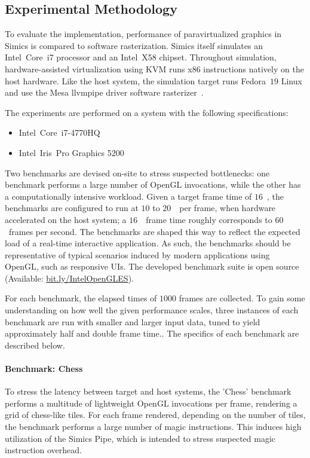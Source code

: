 \subsection{Experimental Methodology}
\label{sec:experimentalmethodology}
To evaluate the implementation, performance of paravirtualized graphics in Simics is compared to software rasterization.
Simics itself simulates an Intel\circledR ~Core\texttrademark ~i7 processor and an Intel\circledR ~X58 chipset.
Throughout simulation, hardware-assisted virtualization using KVM runs x86 instructions natively on the host hardware.
Like the host system, the simulation target runs Fedora~$19$ Linux and use the Mesa llvmpipe driver software rasterizer~.

The experiments are performed on a system with the following specifications:
\begin{itemize}
\item Intel\circledR\ Core\texttrademark\ i7-4770HQ
\item Intel\circledR\ Iris\texttrademark\ Pro Graphics 5200
\end{itemize}

Two benchmarks are devised on-site to stress suspected bottlenecks: one benchmark performs a large number of OpenGL invocations, while the other has a computationally intensive workload.
Given a target frame time of $16$~\milli\second , the benchmarks are configured to run at $10$ to $20$~\milli\second\ per frame, when hardware accelerated on the host system; a $16$~\milli\second\ frame time roughly corresponds to $60$~frames per second.
The benchmarks are shaped this way to reflect the expected load of a real-time interactive application.
As such, the benchmarks should be representative of typical scenarios induced by modern applications using OpenGL, such as responsive UIs.
The developed benchmark suite is open source (Available: \href{http://bit.ly/IntelOpenGLES}{bit.ly/IntelOpenGLES}).

For each benchmark, the elapsed times of $1000$ frames are collected.
To gain some understanding on how well the given performance scales, three instances of each benchmark are run with smaller and larger input data, tuned to yield approximately half and double frame time..
The specifics of each benchmark are described below.

\paragraph{Benchmark: Chess}
\label{par:experimentalmethodology_benchmarking_benchmarkchess}
To stress the latency between target and host systems, the 'Chess' benchmark performs a multitude of lightweight OpenGL invocations per frame, rendering a grid of chess-like tiles.
For each frame rendered, depending on the number of tiles, the benchmark performs a large number of magic instructions.
This induces high utilization of the Simics Pipe, which is intended to stress suspected magic instruction overhead.

